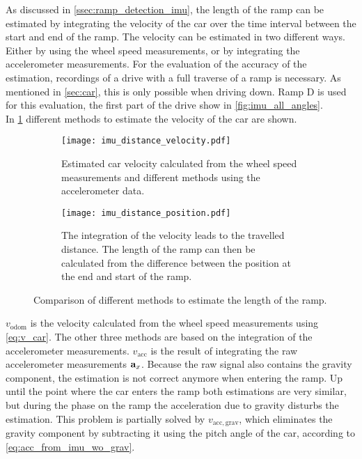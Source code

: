 As discussed in \cref{ssec:ramp_detection_imu}, the length of the ramp can be estimated by integrating the velocity of the car over the time interval between the start and end of the ramp.
The velocity can be estimated in two different ways.
Either by using the wheel speed measurements, or by integrating the accelerometer measurements.
For the evaluation of the accuracy of the estimation, recordings of a drive with a full traverse of a ramp is necessary.
As mentioned in \cref{sec:car}, this is only possible when driving down.
Ramp D is used for this evaluation, the first part of the drive show in \cref{fig:imu_all_angles}.\\
In \cref{fig:imu_distance_velocity} different methods to estimate the velocity of the car are shown.
\begin{figure}[htb]
	\centering
	\begin{subfigure}{1\textwidth}
		\centering
		\texttt{[image: imu\_distance\_velocity.pdf]}
		\caption[Car velocity estimation]{Estimated car velocity calculated from the wheel speed measurements and different methods using the accelerometer data.}
		\label{fig:imu_distance_velocity}
	\end{subfigure}

	\begin{subfigure}{1\textwidth}
		\centering
		\texttt{[image: imu\_distance\_position.pdf]}
		\caption[Car travelled distance estimation]{The integration of the velocity leads to the travelled distance. The length of the ramp can then be calculated from the difference between the position at the end and start of the ramp.}
		\label{fig:imu_distance_position}
	\end{subfigure}
	\caption[Ramp length estimation using various methods]{Comparison of different methods to estimate the length of the ramp.}
\end{figure}
$v_\mathrm{odom}$ is the velocity calculated from the wheel speed measurements using \cref{eq:v_car}.
The other three methods are based on the integration of the accelerometer measurements.
$v_\mathrm{acc}$ is the result of integrating the raw accelerometer measurements $\vb{a}_x$.
Because the raw signal also contains the gravity component, the estimation is not correct anymore when entering the ramp.
Up until the point where the car enters the ramp both estimations are very similar, but during the phase on the ramp the acceleration due to gravity disturbs the estimation.
This problem is partially solved by $v_\mathrm{acc, grav}$, which eliminates the gravity component by subtracting it using the pitch angle of the car, according to \cref{eq:acc_from_imu_wo_grav}.
